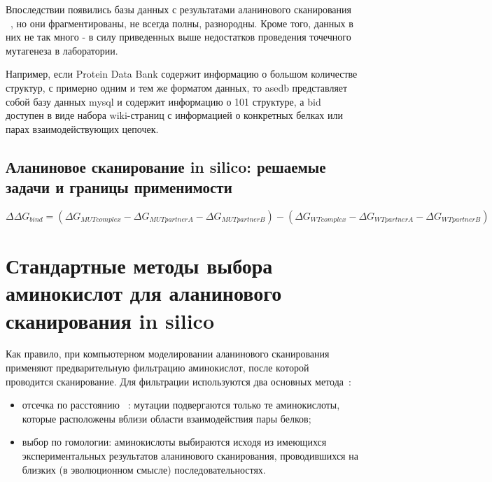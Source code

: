 Впоследствии появились базы данных с результатами аланинового сканирования ~\cite{asedb2001, bid2003}, но они фрагментированы, не всегда полны, разнородны. Кроме того, данных в них не так много - в силу приведенных выше недостатков проведения точечного мутагенеза в лаборатории.

Например, если Protein Data Bank содержит информацию о большом количестве структур, с примерно одним и тем же форматом данных, то asedb представляет собой базу данных mysql и содержит информацию о 101 структуре, а bid доступен в виде набора wiki-страниц с информацией о конкретных белках или парах взаимодействующих цепочек.
 \newpage
\subsection{Аланиновое сканирование in silico: решаемые задачи и границы применимости}




$$
\Delta\Delta G_{bind} = (\Delta G_{MUTcomplex} - \Delta G_{MUTpartner A} - \Delta G_{MUTpartner B}) - (\Delta G_{WTcomplex} - \Delta G_{WTpartner A} - \Delta G_{WTpartner B})
$$
\newpage
\section{Стандартные методы выбора аминокислот для аланинового сканирования in silico}

Как правило, при компьютерном моделировании аланинового сканирования применяют предварительную фильтрацию аминокислот, после которой проводится сканирование. Для фильтрации используются два основных метода~\cite{hotspots2012rev}:
\begin{itemize}
\item отсечка по расстоянию ~\cite{kortemme2004}: мутации подвергаются только те аминокислоты, которые расположены вблизи области взаимодействия пары белков;

\item выбор по гомологии: аминокислоты выбираются исходя из имеющихся экспериментальных результатов аланинового сканирования, проводившихся на близких (в эволюционном смысле) последовательностях.
\end{itemize}

